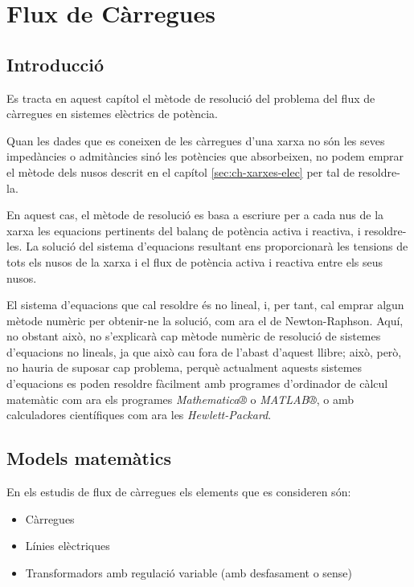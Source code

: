 \chapter{Flux de Càrregues}
\label{sec:ch-flux-carregues}

\section{Introducció}

Es tracta en aquest capítol el mètode de resolució del problema del flux de càrregues en
sistemes elèctrics de potència.

Quan les dades que es coneixen de les càrregues d'una xarxa no són
les seves impedàncies o admitàncies sinó les potències que
absorbeixen, no podem emprar el mètode dels nusos descrit en el
capítol \ref{sec:ch-xarxes-elec} per tal de resoldre-la.

En aquest cas, el mètode de resolució es basa a escriure per a cada
nus de la xarxa les equacions pertinents del balanç de potència activa i
reactiva, i resoldre-les. La solució del sistema d'equacions
resultant ens proporcionarà les tensions de tots els nusos de la
xarxa i el flux de potència activa i reactiva entre els seus nusos.

El sistema d'equacions que cal resoldre és no lineal, i, per tant,
cal emprar algun mètode numèric per obtenir-ne la solució, com ara el
de Newton-Raphson.  Aquí, no obstant això, no
s'explicarà cap mètode numèric de resolució de sistemes d'equacions
no lineals, ja que això cau fora de l'abast d'aquest llibre; això, però,  no hauria de suposar cap problema, perquè actualment aquests
sistemes d'equacions es poden resoldre fàcilment amb programes
d'ordinador de càlcul matemàtic com ara els programes
\emph{Mathematica®} o \emph{MATLAB®}, o amb calculadores
científiques com ara les \emph{Hewlett-Packard}.

\section{Models matemàtics} 

En els estudis de flux de càrregues els elements que es consideren són:
\begin{itemize}
   \item Càrregues
   \item Línies elèctriques
   \item Transformadors amb regulació variable (amb desfasament o sense)
\end{itemize}

